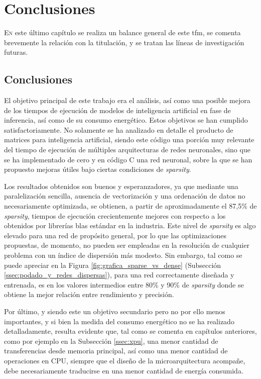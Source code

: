 \chapter{Conclusiones}
\label{chap:conclusiones}

\lettrine{E}{n} este último capítulo se realiza un balance general de este \acrlong{tfm}, se comenta brevemente la relación con la titulación, y se tratan las líneas de investigación futuras.

\section{Conclusiones}
El objetivo principal de este trabajo era el análisis, así como una posible mejora de los tiempos de ejecución de modelos de inteligencia artificial en fase de inferencia, así como de su consumo energético. Estos objetivos se han cumplido satisfactoriamente. No solamente se ha analizado en detalle el producto de matrices para inteligencia artificial, siendo este código una porción muy relevante del tiempo de ejecución de múltiples arquitecturas de redes neuronales, sino que se ha implementado de cero y en código C una red neuronal, sobre la que se han propuesto mejoras útiles bajo ciertas condiciones de \textit{sparsity}.

Los resultados obtenidos son buenos y esperanzadores, ya que mediante una paralelización sencilla, ausencia de vectorización y una ordenación de datos no necesariamente optimizada, se obtienen, a partir de aproximadamente el 87,5\% de \textit{sparsity}, tiempos de ejecución crecientemente mejores con respecto a los obtenidos por librerías \acrshort{blas} estándar en la industria. Este nivel de \textit{sparsity} es algo elevado para una red de propósito general, por lo que las optimizaciones propuestas, de momento, no pueden ser empleadas en la resolución de cualquier problema con un índice de dispersión más modesto. Sin embargo, tal como se puede apreciar en la Figura \ref{fig:grafica_sparse_vs_dense} (Subsección \ref{ssec:podado_y_redes_dispersas}), para una red correctamente diseñada y entrenada, es en los valores intermedios entre 80\% y 90\% de \textit{sparsity} donde se obtiene la mejor relación entre rendimiento y precisión.

Por último, y siendo este un objetivo secundario pero no por ello menos importantes, y si bien la medida del consumo energético no se ha realizado detalladamente, resulta evidente que, tal como se comenta en capítulos anteriores, como por ejemplo en la Subsección \ref{ssec:xpu}, una menor cantidad de transferencias desde memoria principal, así como una menor cantidad de operaciones en CPU, siempre que el diseño de la microarquitectura acompañe, debe necesariamente traducirse en una menor cantidad de energía consumida.

